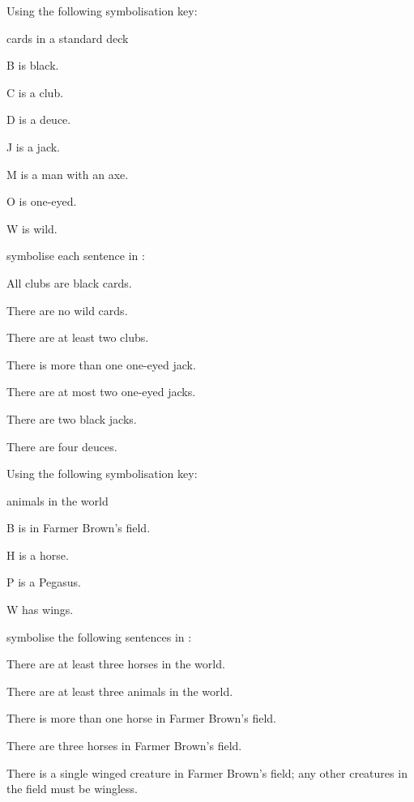 \problempart
\label{pr.FOLcardsa}
Using the following symbolisation key:
\begin{ekey}
\item[\text{domain}] cards in a standard deck
\item[B]  is black.
\item[C]  is a club.
\item[D]  is a deuce.
\item[J]  is a jack.
\item[M]  is a man with an axe.
\item[O]  is one-eyed.
\item[W]  is wild.
\end{ekey}
symbolise each sentence in \FOL:
\begin{earg}
\item All clubs are black cards.
\item There are no wild cards.
\item There are at least two clubs.
\item There is more than one one-eyed jack.
\item There are at most two one-eyed jacks.
\item There are two black jacks.
\item There are four deuces.
\end{earg}

\problempart Using the following symbolisation key:
\begin{ekey}
\item[\text{domain}] animals in the world
\item[B]  is in Farmer Brown's field.
\item[H]  is a horse.
\item[P]  is a Pegasus.
\item[W]  has wings.
\end{ekey}
symbolise the following sentences in \FOL:
\begin{earg}
\item There are at least three horses in the world.
\item There are at least three animals in the world.
\item There is more than one horse in Farmer Brown's field.
\item There are three horses in Farmer Brown's field.
\item There is a single winged creature in Farmer Brown's field; any other creatures in the field must be wingless.
\end{earg}


